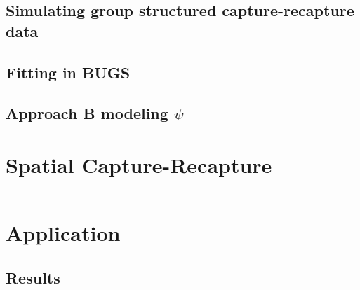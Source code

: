 \subsection{Simulating group structured 
capture-recapture data}


\subsection{Fitting in BUGS}



\subsection{Approach B modeling $\psi$}



\section{Spatial Capture-Recapture}


\begin{equation}
\label{eq.logit}
\end{equation}



\section{Application}



\subsection{Results}


\begin{table}
\centering
\begin{tabular}{lrrr}
\hline \hline
\hline
\end{tabular}
\end{table}







\clearpage

\begin{figure}
\begin{center}
\end{center}
\label{fig.studyarea}
\end{figure}


\clearpage





